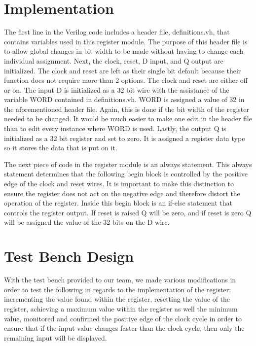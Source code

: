 \documentclass{article}
\newcommand{\Verilog}[3]{
  \lstset{language=Verilog}
  \lstset{backgroundcolor=\color{listinggray},rulecolor=\color{blue}}
  \lstset{linewidth=\textwidth}
  \lstset{commentstyle=\textit, stringstyle=\upshape,showspaces=false}
  \lstset{frame=tb}
  
}
\begin{document}
\section{Implementation}
The first line in the Verilog code includes a header file, definitions.vh, that contains variables used in this register module. The purpose of this header file is to allow global changes in bit width to be made without having to change each individual assignment. Next, the clock, reset, D input, and Q output are initialized. The clock and reset are left as their single bit default because their function does not require more than 2 options. The clock and reset are either off or on. The input D is initialized as a 32 bit wire with the assistance of the variable WORD contained in definitions.vh. WORD is assigned a value of 32 in the aforementioned header file. Again, this is done if the bit width of the register needed to be changed. It would be much easier to make one edit in the header file than to edit every instance where WORD is used. Lastly, the output Q is initialized as a 32 bit register and set to zero. It is assigned a register data type so it stores the data that is put on it. 

The next piece of code in the register module is an always statement. This always statement determines that the following begin block is controlled by the positive edge of the clock and reset wires. It is important to make this distinction to ensure the register does not act on the negative edge and therefore distort the operation of the register. Inside this begin block is an if-else statement that controls the register output. If reset is raised Q will be zero, and if reset is zero Q will be assigned the value of the 32 bits on the D wire.


\section{Test Bench Design}
With the test bench provided to our team, we made various modifications in order to test the following in regards to the implementation of the register: incrementing the value found within the register, resetting the value of the register, achieving a maximum value within the register as well the minimum value, monitored and confirmed the positive edge of the clock cycle in order to ensure that if the input value changes faster than the clock cycle, then only the remaining input will be displayed.
\end{document}
